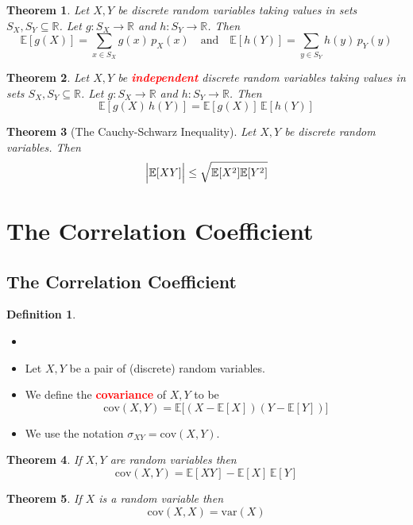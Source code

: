\documentclass{article}
\newcommand{\R}{\mathbb{R}}
\newcommand{\E}{\mathbb{E}}
\newcommand{\var}{\text{var}}
\newcommand{\cov}{\text{cov}}
\newcommand{\bfred}[1]{\textcolor{red}{\textbf{#1}}}
\theoremstyle{plain}
\newtheorem{thm}{Theorem}[section]
\theoremstyle{definition}
\newtheorem{defn}{Definition}[section]
\theoremstyle{remark}
\begin{document}
\begin{thm}
    Let $X,Y$ be discrete random variables taking values in sets $S_X,S_Y\subseteq\R$. Let $g:S_X\rightarrow\R$ and $h:S_Y\rightarrow\R$. Then \[\E[g(X)]=\sum_{x\in S_X}g(x)\,p_X(x)\quad\text{and}\quad\E[h(Y)]=\sum_{y\in S_Y}h(y)\,p_Y(y)\]
\end{thm}

\begin{thm}
    Let $X,Y$ be \bfred{independent} discrete random variables taking values in sets $S_X,S_Y\subseteq\R$. Let $g:S_X\rightarrow\R$ and $h:S_Y\rightarrow\R$. Then \[\E[g(X)\,h(Y)]=\E[g(X)]\,\E[h(Y)]\]
\end{thm}

\begin{thm}[The Cauchy-Schwarz Inequality]
    Let $X,Y$ be discrete random variables. Then \[\Bigr\lvert\E[XY]\Bigr\rvert\leq\sqrt{\E[X^2]\E[Y^2]\vphantom{\bigr\vert}}\]
\end{thm}

\section{The Correlation Coefficient}

\subsection{The Correlation Coefficient}

\begin{defn}
    \begin{itemize}
        \item []
        \item Let $X,Y$ be a pair of (discrete) random variables.
        \item We define the \bfred{covariance} of $X,Y$ to be \[\cov(X,Y)=\E\bigr[(X-\E[X])(Y-\E[Y])\bigr]\]
        \item We use the notation $\sigma_{XY}=\cov(X,Y)$.
    \end{itemize}
\end{defn}

\begin{thm}
    If $X,Y$ are random variables then \[\cov(X,Y)=\E[XY]-\E[X]\,\E[Y]\]
\end{thm}

\begin{thm}
    If $X$ is a random variable then \[\cov(X,X)=\var(X)\]
\end{thm}
\end{document}
